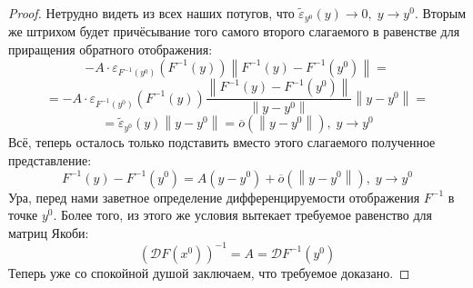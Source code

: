 \documentclass[11pt]{article}
\begin{document}
\begin{proof}
    Нетрудно видеть из всех наших потугов, что $\widetilde{\varepsilon}_{y^0} (y) \to 0, \; y \to y^0$. Вторым же штрихом будет причёсывание того самого второго слагаемого в равенстве для приращения обратного отображения:
    \[-A \cdot \varepsilon_{F^{-1}\left(y^0\right)} \left(F^{-1}\left(y\right)\right) \left\lVert F^{-1}\left(y\right) - F^{-1}\left(y^0\right) \right\rVert = \]
    \[= -A \cdot \varepsilon_{F^{-1}\left(y^0\right)} \left(F^{-1}\left(y\right)\right) \frac{\left\lVert F^{-1}\left(y\right) - F^{-1}\left(y^0\right) \right\rVert}{\left\lVert y - y^0 \right\rVert} \left\lVert y - y^0 \right\rVert =\]
    \[= \widetilde{\varepsilon}_{y^0} (y) \left\lVert y - y^0 \right\rVert = \overline{o} \left(\left\lVert y - y^0 \right\rVert\right), \; y \to y^0\]
    Всё, теперь осталось только подставить вместо этого слагаемого полученное представление:
    \[F^{-1}\left(y\right) - F^{-1}\left(y^0\right) = A\left(y - y^0\right) + \overline{o} \left(\left\lVert y - y^0 \right\rVert\right), \; y \to y^0\]
    Ура, перед нами заветное определение дифференцируемости отображения $F^{-1}$ в точке $y^0$. Более того, из этого же условия вытекает 
    требуемое равенство для матриц Якоби:
    \[\left(\mathcal{D} F \left(x^0\right) \right)^{-1} = A = \mathcal{D} F^{-1} \left(y^0\right)\]
    Теперь уже со спокойной душой заключаем, что требуемое доказано.
\end{proof}
\end{document}
